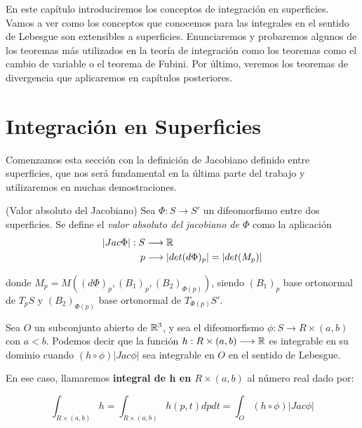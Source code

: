 En este capítulo introduciremos los conceptos de integración en superficies. Vamos a ver como los conceptos que conocemos para las integrales en el sentido de Lebesgue son extensibles a superficies. Enunciaremos y probaremos algunos de los teoremas más utilizados en la teoría de integración como los teoremas como el cambio de variable o el teorema de Fubini. Por último, veremos los teoremas de divergencia que aplicaremos en capítulos posteriores.

\section{Integración en Superficies}

Comenzamos esta sección con la definición de Jacobiano definido entre superficies, que nos será fundamental en la última parte del trabajo y utilizaremos en muchas demostraciones.

\begin{definition}(Valor absoluto del Jacobiano)
Sea $\Phi: S \longrightarrow S'$ un difeomorfismo entre dos superficies. Se define el \textit{valor absoluto del jacobiano de $\Phi$} como la aplicación
\begin{align*}
    |Jac \Phi|: S &\longrightarrow \mathbb{R} \\
    p &\longrightarrow |det(d\Phi)_p| = |det(M_p)|
\end{align*}

donde $M_p=M((d\Phi)_p, (B_1)_p, (B_2)_{\Phi(p)})$, siendo $(B_1)_p$ base ortonormal de $T_pS$ y $(B_2)_{\Phi(p)}$ base ortonormal de $T_{\Phi(p)}S'$.
\end{definition}

\begin{definition}
Sea $O$ un subconjunto abierto de $\mathbb{R}^3$, y sea el difeomorfismo $\phi: S \longrightarrow R \times (a,b)$ con $a < b$. Podemos decir que la función $h: R \times (a,b) \longrightarrow \mathbb{R}$ es integrable en su dominio cuando $(h \circ \phi)|Jac \phi|$ sea integrable en $O$ en el sentido de Lebesgue.

En ese caso, llamaremos \textbf{integral de h en $R \times (a,b)$} al número real dado por:

\begin{equation*}
    \int_{R \times (a,b)} h = \int_{R \times (a,b)} h(p, t)dp dt = \int_{O} (h \circ \phi)|Jac \phi|
\end{equation*}
\end{definition}

